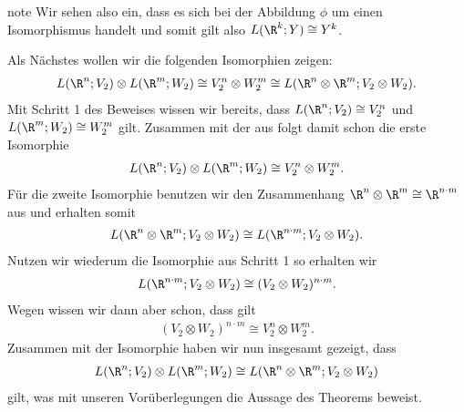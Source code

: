 \documentclass[letterpaper,10pt,english]{jupyterBook}
\begin{document}
\begin{sphinxadmonition}{note}
\sphinxAtStartPar
Wir sehen also ein, dass es sich bei der Abbildung \(\phi\) um einen Isomorphismus handelt und somit gilt also \(L(\R^k; Y) \cong Y^k\).

\sphinxAtStartPar
{} Als Nächstes wollen wir die folgenden Isomorphien zeigen:
\begin{equation*}
\begin{split}L(\R^n; V_2) \otimes L(\R^m; W_2) \cong V_2^n \otimes W_2^m\cong L(\R^n\otimes \R^m; V_2\otimes W_2).\end{split}
\end{equation*}
\sphinxAtStartPar
Mit Schritt 1 des Beweises wissen wir bereits, dass \(L(\R^n; V_2)\cong V_2^n\) und \(L(\R^m; W_2)\cong W_2^m\) gilt.
Zusammen mit der  aus {\hyperref[\detokenize{vektoranalysis/tensor:lem:natISO}]{}} folgt damit schon die erste Isomorphie
\begin{equation}\label{equation:vektoranalysis/tensor:eq:ersteIsormorphie}
\begin{split}L(\R^n; V_2) \otimes L(\R^m; W_2) \cong V_2^n \otimes W_2^m.\end{split}
\end{equation}
\sphinxAtStartPar
Für die zweite Isomorphie benutzen wir den Zusammenhang \(\R^n\otimes \R^m \cong \R^{n\cdot m}\) aus {\hyperref[\detokenize{vektoranalysis/tensor:cor:isomorphieEndlichDimensional}]{}} und erhalten somit
\begin{equation*}
\begin{split}L(\R^n\otimes \R^m; V_2\otimes W_2) \cong L(\R^{n\cdot m}; V_2\otimes W_2).\end{split}
\end{equation*}
\sphinxAtStartPar
Nutzen wir wiederum die Isomorphie aus Schritt 1 so erhalten wir
\begin{equation*}
\begin{split}L(\R^{n\cdot m}; V_2\otimes W_2) \cong (V_2 \otimes W_2)^{n\cdot m}.\end{split}
\end{equation*}
\sphinxAtStartPar
Wegen {\hyperref[\detokenize{vektoranalysis/tensor:lem:isomorphieKartesischesProdukt}]{}} wissen wir dann aber schon, dass gilt
\begin{equation*}
\begin{split}(V_2 \otimes W_2)^{n\cdot m} \cong V_2^n \otimes W_2^m.\end{split}
\end{equation*}
\sphinxAtStartPar
Zusammen mit der Isomorphie {\hyperref[\detokenize{vektoranalysis/tensor:equation-eq-ersteisormorphie}]{}} haben wir nun insgesamt gezeigt, dass
\begin{equation*}
\begin{split}L(\R^n; V_2) \otimes L(\R^m; W_2) \cong L(\R^n\otimes \R^m; V_2\otimes W_2)\end{split}
\end{equation*}
\sphinxAtStartPar
gilt, was mit unseren Vorüberlegungen die Aussage des Theorems beweist.
\end{sphinxadmonition}
\end{document}
